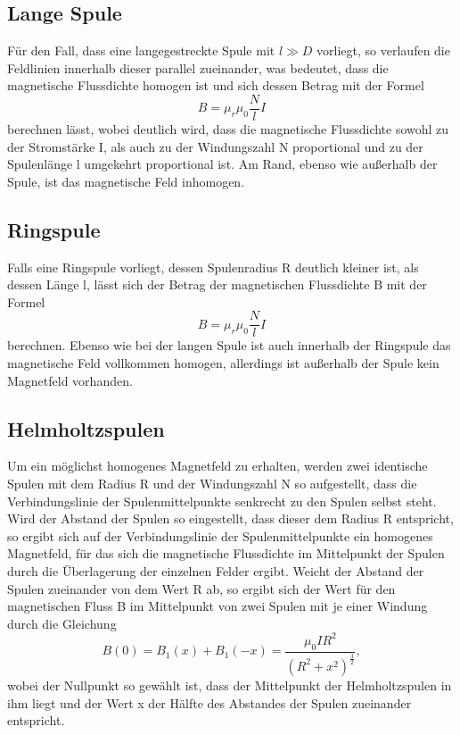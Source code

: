 \subsection{Lange Spule}

Für den Fall, dass eine langegestreckte Spule mit $l \gg D$ vorliegt, so verlaufen die Feldlinien 
innerhalb dieser parallel zueinander, was bedeutet, dass die magnetische Flussdichte homogen 
ist und sich dessen Betrag mit der Formel
\begin{equation}
    B = \mu_r \mu_0 \frac{N}{l} I
    \label{eq:a}
\end{equation}
\noindent 
berechnen lässt, wobei deutlich wird, dass die magnetische Flussdichte sowohl zu der Stromstärke I, 
als auch zu der Windungszahl N proportional und zu der Spulenlänge l umgekehrt proportional ist.
Am Rand, ebenso wie außerhalb der Spule, ist das magnetische Feld inhomogen.

\subsection{Ringspule}

Falls eine Ringspule vorliegt, dessen Spulenradius R deutlich kleiner ist, als dessen Länge l, lässt sich
der Betrag der magnetischen Flussdichte B mit der Formel
\begin{equation}
    B = \mu_r \mu_0 \frac{N}{l} I
\end{equation}
\noindent
berechnen. Ebenso wie bei der langen Spule ist auch innerhalb der Ringspule das magnetische Feld
vollkommen homogen, allerdings ist außerhalb der Spule kein Magnetfeld vorhanden.


\subsection{Helmholtzspulen}

Um ein möglichst homogenes Magnetfeld zu erhalten, werden zwei identische Spulen mit dem Radius R und der Windungszahl N 
so aufgestellt, dass die Verbindungslinie der Spulenmittelpunkte senkrecht zu den Spulen selbst steht. Wird der Abstand 
der Spulen so eingestellt, dass dieser dem Radius R entspricht, so ergibt sich auf der Verbindungslinie der 
Spulenmittelpunkte ein homogenes Magnetfeld, für das sich die magnetische Flussdichte im Mittelpunkt der Spulen durch
die Überlagerung der einzelnen Felder ergibt. 
Weicht der Abstand der Spulen zueinander von dem Wert R ab, so ergibt sich der Wert für den magnetischen Fluss B im 
Mittelpunkt von zwei Spulen mit je einer Windung durch die Gleichung
\begin{equation}
    B(0) = B_1(x) + B_1(-x) = \frac{\mu_0 I R^2}{(R^2 + x^2)^{\frac{3}{2}}},
    \label{eq:b}
\end{equation}
\noindent
wobei der Nullpunkt so gewählt ist, dass der Mittelpunkt der Helmholtzspulen in ihm liegt und der Wert x 
der Hälfte des Abstandes der Spulen zueinander entspricht.

